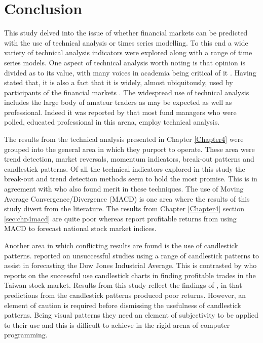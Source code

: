 \section{Conclusion}
This study delved into the issue of whether financial markets can be predicted with the use of technical analysis or times series modelling.  To this end a wide variety of technical analysis indicators were explored along with a range of time series models. One aspect of technical analysis worth noting is that opinion is divided as to its value, with many voices in academia being critical of it \citep{Kuang2014192, Fang201430, Bajgrowicz2012473}. Having stated that, it is also a fact that it is widely, almost ubiquitously, used by participants of the financial markets \citep{Taylor1992304}. The widespread use of technical analysis includes the large body of amateur traders as may be expected as well as professional. Indeed it was reported by \cite{Menkhoff20102573} that most fund managers who were polled, educated professional in this arena, employ technical analysis.

The results from the technical analysis presented in Chapter \ref{Chapter4} were grouped into the general area in which they purport to operate. These area were trend detection, market reversals, momentum indicators, break-out patterns and candlestick patterns. Of all the technical indicators explored in this study the break-out and trend detection methods seem to hold the most promise. This is in agreement with \cite{Brock} who also found merit in these techniques. The use of Moving Average Convergence/Divergence (MACD) is one area where the results of this study divert from the literature. The results from Chapter \ref{Chapter4} section \ref{sec:chp4macd} are quite poor whereas \cite{Prodan2013214} report profitable returns from using MACD to forecast national stock market indices.

Another area in which conflicting results are found is the use of candlestick patterns.  \cite{Marshall20062303} reported on unsuccessful studies using a range of candlestick patterns to assist in forecasting the Dow Jones Industrial Average. This is contrasted by \cite{Lu201465} who reports on the successful use candlestick charts in finding profitable trades in the Taiwan stock market.  Results from this study reflect the findings of \cite{Marshall20062303}, in that predictions from the candlestick patterns produced poor returns. However, an element of caution is required before dismissing the usefulness of candlestick patterns. Being visual patterns they need an element of subjectivity to be applied to their use and this is difficult to achieve in the rigid arena of computer programming. %

